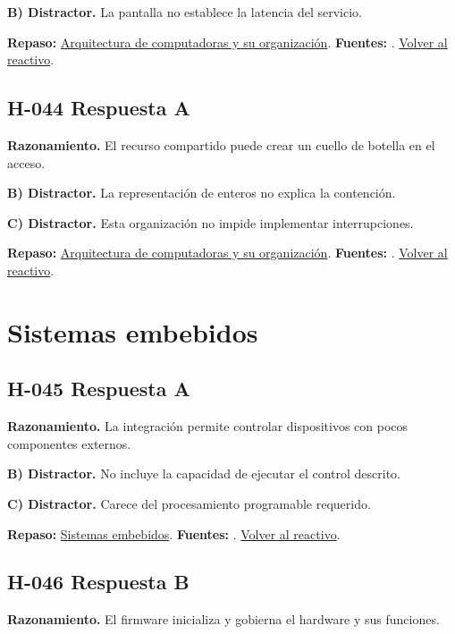 \textbf{B) Distractor. }La pantalla no establece la latencia del servicio.

\textbf{Repaso:} \hyperref[sec:h2]{Arquitectura de computadoras y su organización}. \textbf{Fuentes:} \cite{intel,architecture}. \hyperref[q:H-043]{Volver al reactivo}.\par\medskip

\subsection*{H-044 \quad Respuesta A}\label{s:H-044}
\textbf{Razonamiento.} El recurso compartido puede crear un cuello de botella en el acceso.

\textbf{B) Distractor. }La representación de enteros no explica la contención.

\textbf{C) Distractor. }Esta organización no impide implementar interrupciones.

\textbf{Repaso:} \hyperref[sec:h2]{Arquitectura de computadoras y su organización}. \textbf{Fuentes:} \cite{intel,architecture}. \hyperref[q:H-044]{Volver al reactivo}.\par\medskip

\section{Sistemas embebidos}

\subsection*{H-045 \quad Respuesta A}\label{s:H-045}
\textbf{Razonamiento.} La integración permite controlar dispositivos con pocos componentes externos.

\textbf{B) Distractor. }No incluye la capacidad de ejecutar el control descrito.

\textbf{C) Distractor. }Carece del procesamiento programable requerido.

\textbf{Repaso:} \hyperref[sec:h3]{Sistemas embebidos}. \textbf{Fuentes:} \cite{avr,arduino,sensors}. \hyperref[q:H-045]{Volver al reactivo}.\par\medskip

\subsection*{H-046 \quad Respuesta B}\label{s:H-046}
\textbf{Razonamiento.} El firmware inicializa y gobierna el hardware y sus funciones.

